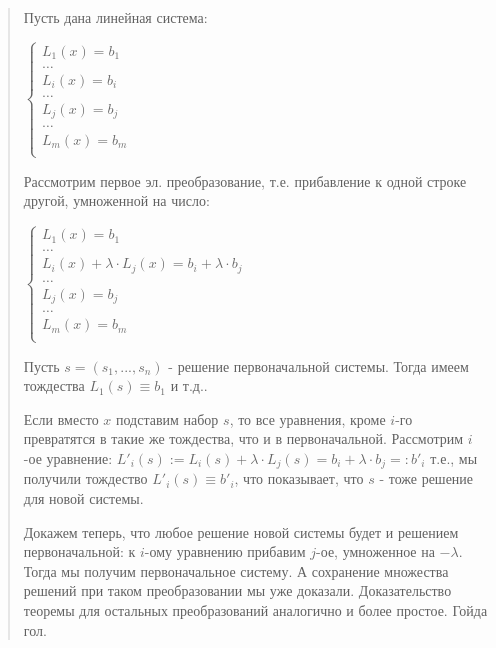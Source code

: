 \documentclass{article}
\begin{document}
\begin{quote}
    Пусть дана линейная система:

    $
    \begin{cases}
        L_1(x) = b_1 \\
        \dots \\
        L_i(x) = b_i \\ 
        \dots \\
        L_j(x) = b_j \\ 
        \dots \\
        L_m(x) = b_m \\ 
    \end{cases}
    $
    
    Рассмотрим первое эл. преобразование, т.е. прибавление к одной строке другой, умноженной на число:
    
    $
    \begin{cases}
        L_1(x) = b_1 \\
        \dots \\
        L_i(x) + \lambda \cdot L_j(x) = b_i + \lambda \cdot b_j \\ 
        \dots \\
        L_j(x) = b_j \\ 
        \dots \\
        L_m(x) = b_m \\ 
    \end{cases}
    $

    Пусть $s = (s_1, ..., s_n)$ - решение первоначальной системы. Тогда имеем тождества $L_1(s) \equiv b_1$ и т.д..

    Если вместо $x$ подставим набор $s$, то все уравнения, кроме $i$-го превратятся в такие же тождества, что и в первоначальной. Рассмотрим $i$-ое уравнение: $L'_i(s) := L_i(s) + \lambda \cdot L_j(s) = b_i + \lambda \cdot b_j =: b'_i$ т.е., мы получили тождество $L'_i(s) \equiv b'_i$, что показывает, что $s$ - тоже решение для новой системы.

    Докажем теперь, что любое решение новой системы будет и решением первоначальной: к $i$-ому уравнению прибавим $j$-ое, умноженное на $-\lambda$. Тогда мы получим первоначальное систему. А сохранение множества решений при таком преобразовании мы уже доказали. Доказательство теоремы для остальных преобразований аналогично и более простое. Гойда гол.

    
\end{quote}
\end{document}
